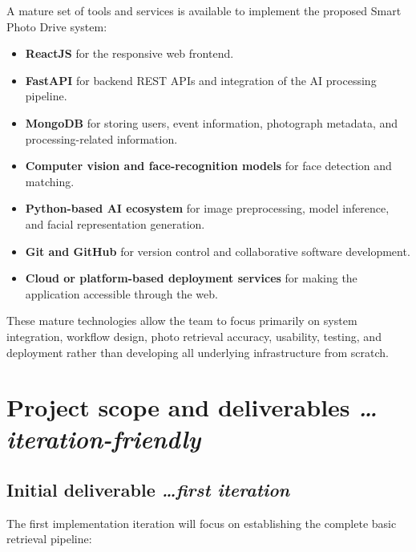 \documentclass[11pt,a4paper]{article}
\newcommand{\BvrHint}[1]{%
  {\normalfont\normalsize\itshape\hfill #1}}
\begin{document}
A mature set of tools and services is available to implement the
proposed Smart Photo Drive system:

\begin{itemize}[leftmargin=0.7cm]
    \item \textbf{ReactJS} for the responsive web frontend.

    \item \textbf{FastAPI} for backend REST APIs and integration of the
    AI processing pipeline.

    \item \textbf{MongoDB} for storing users, event information,
    photograph metadata, and processing-related information.

    \item \textbf{Computer vision and face-recognition models} for face
    detection and matching.

    \item \textbf{Python-based AI ecosystem} for image preprocessing,
    model inference, and facial representation generation.

    \item \textbf{Git and GitHub} for version control and collaborative
    software development.

    \item \textbf{Cloud or platform-based deployment services} for
    making the application accessible through the web.
\end{itemize}

These mature technologies allow the team to focus primarily on system
integration, workflow design, photo retrieval accuracy, usability,
testing, and deployment rather than developing all underlying
infrastructure from scratch.

\section{Project scope and deliverables %
  \BvrHint{\ldots iteration-friendly}}

\subsection{Initial deliverable %
  \BvrHint{\ldots first iteration}}

The first implementation iteration will focus on establishing the
complete basic retrieval pipeline:
\end{document}
